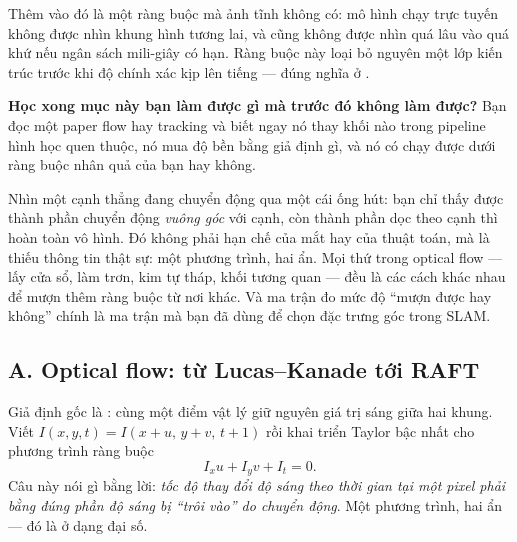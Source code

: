 \documentclass[../../../deep_learning.tex]{subfiles}
\begin{document}
Thêm vào đó là một ràng buộc mà ảnh tĩnh không có: mô hình chạy trực tuyến không được nhìn khung hình tương lai, và cũng không được nhìn quá lâu vào quá khứ nếu ngân sách mili-giây có hạn. Ràng buộc này loại bỏ nguyên một lớp kiến trúc trước khi độ chính xác kịp lên tiếng --- đúng nghĩa  ở .

\textbf{Học xong mục này bạn làm được gì mà trước đó không làm được?} Bạn đọc một paper flow hay tracking và biết ngay nó thay khối nào trong pipeline hình học quen thuộc, nó mua độ bền bằng giả định gì, và nó có chạy được dưới ràng buộc nhân quả của bạn hay không.

\begin{trucgiac}
Nhìn một cạnh thẳng đang chuyển động qua một cái ống hút: bạn chỉ thấy được thành phần chuyển động \emph{vuông góc} với cạnh, còn thành phần dọc theo cạnh thì hoàn toàn vô hình. Đó không phải hạn chế của mắt hay của thuật toán, mà là thiếu thông tin thật sự: một phương trình, hai ẩn. Mọi thứ trong optical flow --- lấy cửa sổ, làm trơn, kim tự tháp, khối tương quan --- đều là các cách khác nhau để mượn thêm ràng buộc từ nơi khác. Và ma trận đo mức độ ``mượn được hay không'' chính là ma trận mà bạn đã dùng để chọn đặc trưng góc trong SLAM.
\end{trucgiac}

\subsection{A. Optical flow: từ Lucas--Kanade tới RAFT}
Giả định gốc là : cùng một điểm vật lý giữ nguyên giá trị sáng giữa hai khung. Viết \(I(x,y,t) = I(x+u,\,y+v,\,t+1)\) rồi khai triển Taylor bậc nhất cho phương trình ràng buộc
\[
I_x u + I_y v + I_t = 0 .
\]
Câu này nói gì bằng lời: \emph{tốc độ thay đổi độ sáng theo thời gian tại một pixel phải bằng đúng phần độ sáng bị ``trôi vào'' do chuyển động}. Một phương trình, hai ẩn --- đó là  ở dạng đại số.
\end{document}
